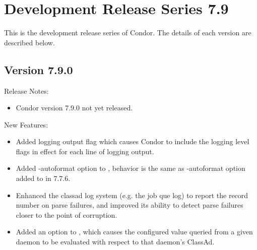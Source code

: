 
\section{\label{sec:History-7-9}Development Release Series 7.9}

This is the development release series of Condor.
The details of each version are described below.

\subsection*{\label{sec:New-7-9-0}Version 7.9.0}

\noindent Release Notes:

\begin{itemize}

\item Condor version 7.9.0 not yet released.

\end{itemize}


\noindent New Features:

\begin{itemize}

\item Added logging output flag  which causes Condor to include the logging level
flags in effect for each line of logging output.

\item Added -autoformat option to , behavior is the same as -autoformat option
added to  in 7.7.6.

\item Enhanced the classad log system (e.g. the job que log) to report the record number on parse failures, 
and improved its ability to detect parse failures closer to the point of corruption.

\item Added an  option to , which causes the configured value queried from
a given daemon to be evaluated with respect to that daemon's ClassAd.

\end{itemize}

